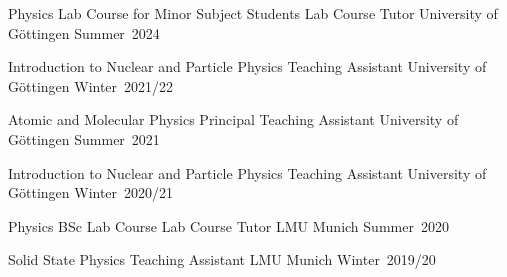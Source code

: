 


\begin{cvhonorsleft}[4.5cm]

  \cvhonor
    {Physics Lab Course for Minor Subject Students} %
    {Lab Course Tutor} %
    {University of G\"ottingen} %
    {Summer~2024} %

  \cvhonor
    {Introduction to Nuclear and Particle Physics} %
    {Teaching Assistant} %
    {University of G\"ottingen} %
    {Winter~2021/22} %

  \cvhonor
    {Atomic and Molecular Physics} %
    {%
      Principal Teaching Assistant%
    } %
    {University of G\"ottingen} %
    {Summer~2021} %

  \cvhonor
    {Introduction to Nuclear and Particle Physics} %
    {Teaching Assistant} %
    {University of G\"ottingen} %
    {Winter~2020/21} %

  \cvhonor
    {Physics BSc Lab Course} %
    {Lab Course Tutor} %
    {LMU Munich} %
    {Summer~2020} %

  \cvhonor
    {Solid State Physics} %
    {Teaching Assistant} %
    {LMU Munich} %
    {Winter~2019/20} %

\end{cvhonorsleft}
